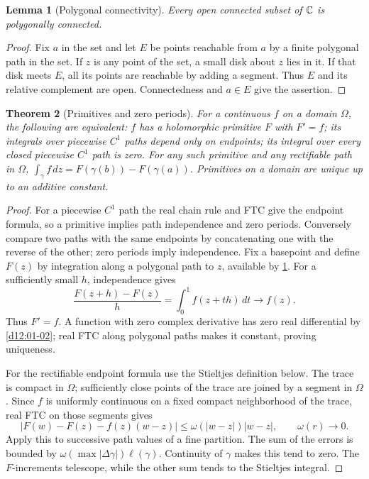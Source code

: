 \documentclass[11pt,a4paper,openany]{book}
\newtheorem{theorem}{Theorem}[chapter]
\newtheorem{lemma}[theorem]{Lemma}
\theoremstyle{definition}
\theoremstyle{remark}\newtheorem{remark}[theorem]{Remark}
\newcommand{\dd}{\,d}\newcommand{\iu}{\mathrm i}
\newcommand{\family}[1]{}
\begin{document}
\begin{lemma}[Polygonal connectivity]\label{d12:03:polygonal-connectivity}
Every open connected subset of \(\mathbb C\) is polygonally connected.
\end{lemma}
\begin{proof}
Fix \(a\) in the set and let \(E\) be points reachable from \(a\) by a finite
polygonal path in the set. If \(z\) is any point of the set, a small disk
about \(z\) lies in it. If that disk meets \(E\), all its points are reachable
by adding a segment. Thus \(E\) and its relative complement are open.
Connectedness and \(a\in E\) give the assertion.
\end{proof}

\begin{theorem}[Primitives and zero periods]\family{D12.03.04}\label{d12:03-04}
For a continuous \(f\) on a domain \(\Omega\), the following are equivalent:
\(f\) has a holomorphic primitive \(F\) with \(F'=f\);
its integrals over piecewise \(C^1\) paths depend only on endpoints;
its integral over every closed piecewise \(C^1\) path is zero.
For any such primitive and any rectifiable path in \(\Omega\),
\(\int_\gamma f\dd z=F(\gamma(b))-F(\gamma(a))\).
Primitives on a domain are unique up to an additive constant.
\end{theorem}
\begin{proof}
For a piecewise \(C^1\) path the real chain rule and FTC give the endpoint
formula, so a primitive implies path independence and zero periods.
Conversely compare two paths with the same endpoints by concatenating
one with the reverse of the other; zero periods imply independence.
Fix a basepoint and define \(F(z)\) by integration along a polygonal path
to \(z\), available by \cref{d12:03:polygonal-connectivity}.
For a sufficiently small \(h\), independence gives
\[
 \frac{F(z+h)-F(z)}h=\int_0^1f(z+th)\dd t\longrightarrow f(z).
\]
Thus \(F'=f\). A function with zero complex derivative has zero real
differential by \cref{d12:01-02}; real FTC along polygonal paths makes it
constant, proving uniqueness.

For the rectifiable endpoint formula use the Stieltjes definition below.
The trace is compact in \(\Omega\); sufficiently close points of the
trace are joined by a segment in \(\Omega\).
Since \(f\) is uniformly continuous on a fixed compact neighborhood of
the trace, real FTC on those segments gives
\[
 |F(w)-F(z)-f(z)(w-z)|\le\omega(|w-z|)|w-z|,
 \qquad \omega(r)\to0.
\]
Apply this to successive path values of a fine partition. The sum of
the errors is bounded by \(\omega(\max|\Delta\gamma|)\ell(\gamma)\).
Continuity of \(\gamma\) makes this tend to zero. The \(F\)-increments
telescope, while the other sum tends to the Stieltjes integral.
\end{proof}
\end{document}
